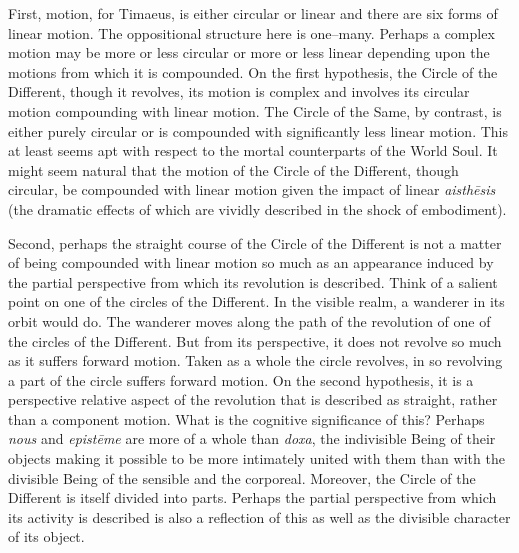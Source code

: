First, motion, for Timaeus, is either circular or linear and there are six forms of linear motion. The oppositional structure here is one--many. Perhaps a complex motion may be more or less circular or more or less linear depending upon the motions from which it is compounded. On the first hypothesis, the Circle of the Different, though it revolves, its motion is complex and involves its circular motion compounding with linear motion. The Circle of the Same, by contrast, is either purely circular or is compounded with significantly less linear motion. This at least seems apt with respect to the mortal counterparts of the World Soul. It might seem natural that the motion of the Circle of the Different, though circular, be compounded with linear motion given the impact of linear \emph{aisthēsis} (the dramatic effects of which are vividly described in the shock of embodiment).

Second, perhaps the straight course of the Circle of the Different is not a matter of being compounded with linear motion so much as an appearance induced by the partial perspective from which its revolution is described. Think of a salient point on one of the circles of the Different. In the visible realm, a wanderer in its orbit would do. The wanderer moves along the path of the revolution of one of the circles of the Different. But from its perspective, it does not revolve so much as it suffers forward motion.  Taken as a whole the circle revolves, in so revolving a part of the circle suffers forward motion. On the second hypothesis, it is a perspective relative aspect of the revolution that is described as straight, rather than a component motion. What is the cognitive significance of this? Perhaps \emph{nous} and \emph{epistēme} are more of a whole than \emph{doxa}, the indivisible Being of their objects making it possible to be more intimately united with them than with the divisible Being of the sensible and the corporeal. Moreover, the Circle of the Different is itself divided into parts. Perhaps the partial perspective from which its activity is described is also a reflection of this as well as the divisible character of its object.

